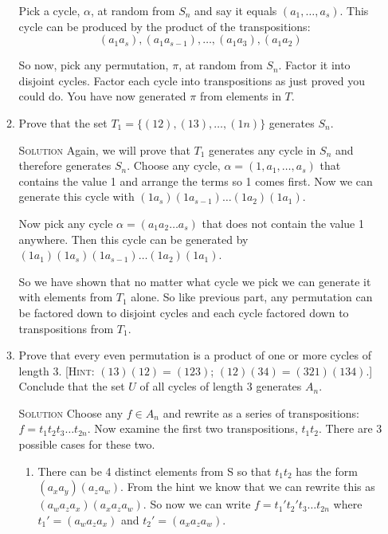 \documentclass[twoside]{amsart}
\newcommand{\solution}{\textsc{Solution}\xspace}
\begin{document}
\begin{enumerate}[A.]
\begin{enumerate}[1]
      Pick a cycle, $\alpha$, at random from $S_n$ and say it equals
      $(a_1,\ldots,a_s)$. This cycle can be produced by the product
      of the transpositions:
       \[(a_1a_s),(a_1a_{s-1}),\ldots,(a_1a_3),
      (a_1a_2) \]

      So now, pick any permutation, $\pi$, at random from $S_n$. Factor
      it into disjoint cycles. Factor each cycle into transpositions
      as just proved you could do. You have now generated $\pi$
      from elements in $T$.

      \item Prove that the set $T_1=\{(12),(13),\ldots,(1n)\}$
      generates $S_n$.

      \noindent \solution Again, we will prove that $T_1$ generates
      any cycle in $S_n$ and therefore generates $S_n$. Choose
      any cycle, $\alpha=(1,a_1,\ldots,a_s)$ that contains the value 1
      and arrange the terms so 1 comes first. Now we can generate
      this cycle with $(1a_s)(1a_{s-1})\ldots(1a_2)(1a_1)$.

      Now pick any cycle $\alpha=(a_1a_2\ldots a_s)$ that does not contain
      the value 1 anywhere. Then this cycle can be generated by
      $(1a_1)(1a_s)(1a_{s-1})\ldots(1a_2)(1a_1)$.

      So we have shown that no matter what cycle we pick we can generate
      it with elements from $T_1$ alone. So like previous part, any 
      permutation can be factored down to disjoint cycles and each cycle
      factored down to transpositions from $T_1$.

      \item Prove that every even permutation is a product of one or
      more cycles of length 3. [\textsc{Hint}: $(13)(12)=(123)$;
      $(12)(34)=(321)(134)$.] Conclude that the set $U$ of all cycles of 
      length 3 generates $A_n$.

      \noindent \solution Choose any $f \in A_n$ and rewrite as a series
      of transpositions: $f = t_1 t_2 t_3 \ldots t_{2n}$. Now examine
      the first two transpositions, $t_1 t_2$. There are 3 possible cases
      for these two. 
         
         \begin{enumerate}[1]
         \item There can be 4 distinct elements from S so that
          $t_1 t_2$ has the form $(a_x a_y)(a_z a_w)$. From the hint we know
          that we can rewrite this as $(a_w a_z a_x)(a_x a_z a_w)$. So
          now we can write $f = t_1' t_2' t_3 \ldots t_{2n}$ where 
          $t_1' = (a_w a_z a_x)$ and $t_2' = (a_x a_z a_w)$.



\end{enumerate}
\end{enumerate}
\end{enumerate}
\end{document}
